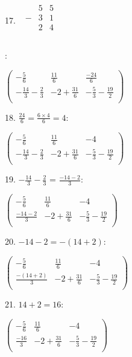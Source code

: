 \documentclass{article}
\begin{document}
17. $\begin{array}{c}
\begin{array}{ccc}
\text{ }& 5 & 5 \\
 - & 3 & 1 \\
\hline
\text{  }& 2 & 4 \\
\end{array}
 \\
\end{array}$

:

$\left(
\begin{array}{ccc}
-\frac{5}{6} & \frac{11}{6} & \frac{-24}{6} \\
 -\frac{14}{3}-\frac{2}{3} & -2+\frac{31}{6} & -\frac{5}{3}-\frac{19}{2} \\
\end{array}
\right)$

18. $\frac{24}{6}=\frac{6\times 4}{6}=4:$

$\left(
\begin{array}{ccc}
-\frac{5}{6} & \frac{11}{6} & -4 \\
 -\frac{14}{3}-\frac{2}{3} & -2+\frac{31}{6} & -\frac{5}{3}-\frac{19}{2} \\
\end{array}
\right)$

19. $-\frac{14}{3}-\frac{2}{3}\text{ = }\frac{-14-2}{3}$:

$\left(
\begin{array}{ccc}
-\frac{5}{6} & \frac{11}{6} & -4 \\
 \frac{-14-2}{3} & -2+\frac{31}{6} & -\frac{5}{3}-\frac{19}{2} \\
\end{array}
\right)$

20. $-14-2=-(14+2):$

$\left(
\begin{array}{ccc}
-\frac{5}{6} & \frac{11}{6} & -4 \\
 \frac{-(14+2)}{3} & -2+\frac{31}{6} & -\frac{5}{3}-\frac{19}{2} \\
\end{array}
\right)$

21. $14+2=16:$

$\left(
\begin{array}{ccc}
-\frac{5}{6} & \frac{11}{6} & -4 \\
 \frac{-16}{3} & -2+\frac{31}{6} & -\frac{5}{3}-\frac{19}{2} \\
\end{array}
\right)$
\end{document}
